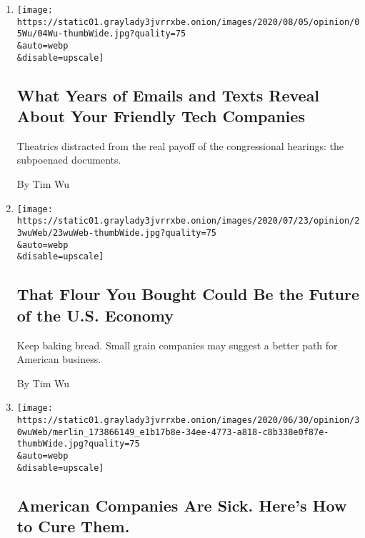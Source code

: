 \begin{enumerate}
\def\labelenumi{\arabic{enumi}.}
\item
  \href{/2020/08/04/opinion/amazon-facebook-congressional-hearings.html}{}

  \texttt{[image: https://static01.graylady3jvrrxbe.onion/images/2020/08/05/opinion/05Wu/04Wu-thumbWide.jpg?quality=75\\\&auto=webp\\\&disable=upscale]}

  \hypertarget{what-years-of-emails-and-texts-reveal-about-your-friendly-tech-companies}{%
  \subsection{What Years of Emails and Texts Reveal About Your Friendly
  Tech
  Companies}\label{what-years-of-emails-and-texts-reveal-about-your-friendly-tech-companies}}

  Theatrics distracted from the real payoff of the congressional
  hearings: the subpoenaed documents.

  By Tim Wu
\item
  \href{/2020/07/24/opinion/us-grain-industry.html}{}

  \texttt{[image: https://static01.graylady3jvrrxbe.onion/images/2020/07/23/opinion/23wuWeb/23wuWeb-thumbWide.jpg?quality=75\\\&auto=webp\\\&disable=upscale]}

  \hypertarget{that-flour-you-bought-could-be-the-future-of-the-us-economy}{%
  \subsection{That Flour You Bought Could Be the Future of the U.S.
  Economy}\label{that-flour-you-bought-could-be-the-future-of-the-us-economy}}

  Keep baking bread. Small grain companies may suggest a better path for
  American business.

  By Tim Wu
\item
  \href{/2020/06/30/opinion/sunday/mergers-buyouts-economy-inequality.html}{}

  \texttt{[image: https://static01.graylady3jvrrxbe.onion/images/2020/06/30/opinion/30wuWeb/merlin\_173866149\_e1b17b8e-34ee-4773-a818-c8b338e0f87e-thumbWide.jpg?quality=75\\\&auto=webp\\\&disable=upscale]}

  \hypertarget{american-companies-are-sick-heres-how-to-cure-them}{%
  \subsection{American Companies Are Sick. Here's How to Cure
  Them.}\label{american-companies-are-sick-heres-how-to-cure-them}}


\end{enumerate}
